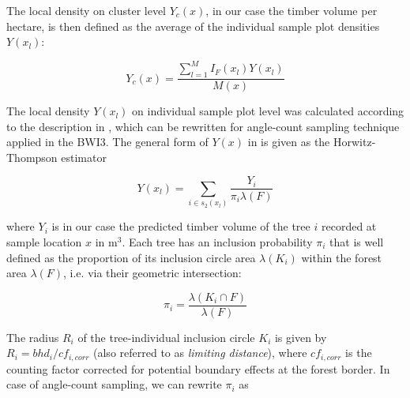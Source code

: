 The local density on cluster level $Y_{c}(x)$, in our case the timber volume per hectare, is then defined as the average of the individual sample plot densities $Y(x_l)$:

\begin{equation}\label{eq:locdens_clust}
Y_{c}(x) = \frac{\sum_{l=1}^{M} I_{F}(x_{l}) Y(x_l)}{M(x)}
\end{equation}

The local density $Y(x_l)$ on individual sample plot level was calculated according to the description in \citet{mandallaz2008}, which can be rewritten for angle-count sampling technique applied in the BWI3. The general form of $Y(x)$ in \citet{mandallaz2008} is given as the Horwitz-Thompson estimator 


\begin{equation}\label{eq:locdens_plot}
Y(x_l)=\sum_{i \in s_{2}(x_l)}\frac{Y_i}{\pi_{i}\lambda(F)}
\end{equation}

where $Y_i$ is in our case the predicted timber volume of the tree $i$ recorded at sample location $x$ in m$^3$. Each tree has an inclusion probability $\pi_{i}$ that is well defined as the proportion of its inclusion circle area $\lambda(K_i)$ within the forest area $\lambda(F)$, i.e. via their geometric intersection:

%

\begin{equation}\label{locdens_plot_1}
\pi_{i} = \frac{\lambda(K_i \cap F)}{\lambda(F)}
\end{equation}

The radius $R_i$ of the tree-individual inclusion circle $K_i$ is given by $R_i = bhd_{i}/cf_{i,corr}$ (also referred to as \textit{limiting distance}), where $cf_{i,corr}$ is the counting factor corrected for potential boundary effects at the forest border. In case of angle-count sampling, we can rewrite $\pi_{i}$ as

